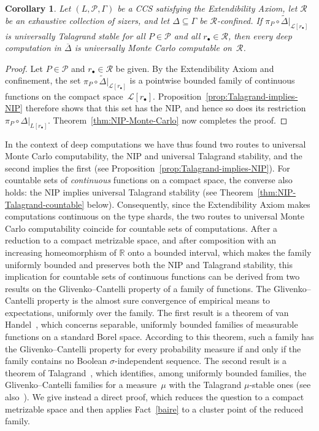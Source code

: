 \documentclass[psamsfonts]{amsart}
\newtheorem{cor}[thm]{Corollary}
\theoremstyle{definition}
\theoremstyle{remark}
\numberwithin{equation}{section}
\begin{document}
\begin{cor}
  \label{cor:Talagrand-stab-Monte-Carlo}
  Let $(L,\mathcal{P},\Gamma)$ be a CCS satisfying the Extendibility Axiom, let $\mathscr{R}$ be an exhaustive collection of sizers, and let $\Delta\subseteq\Gamma$ be $\mathscr{R}$-confined.
  If $\pi_P\circ\tilde\Delta|_{\mathcal{L}[r_\bullet]}$ is universally Talagrand stable for all $P\in\mathcal{P}$ and all $r_{\bullet}\in \mathscr{R}$, then every deep computation in $\overline{\Delta}$ is universally Monte Carlo computable on~$\mathscr{R}$.
\end{cor}

\begin{proof}
  Let $P\in\mathcal{P}$ and $r_\bullet\in \mathscr{R}$ be given.
  By the Extendibility Axiom and confinement, the set $\pi_P\circ\tilde\Delta|_{\mathcal{L}[r_\bullet]}$ is a pointwise bounded family of continuous functions on the compact space~$\mathcal{L}[r_\bullet]$.
  Proposition~\ref{prop:Talagrand-implies-NIP} therefore shows that this set has the NIP, and hence so does its restriction $\pi_P\circ\Delta|_{L[r_\bullet]}$.
  Theorem~\ref{thm:NIP-Monte-Carlo} now completes the proof.
\end{proof}

In the context of deep computations we have thus found two routes to universal Monte Carlo computability, the NIP and universal Talagrand stability, and the second implies the first (see Proposition~\ref{prop:Talagrand-implies-NIP}).
For countable sets of \emph{continuous} functions on a compact space, the converse also holds: the NIP implies universal Talagrand stability (see Theorem~\ref{thm:NIP-Talagrand-countable} below).
Consequently, since the Extendibility Axiom makes computations continuous on the type shards, the two routes to universal Monte Carlo computability coincide for countable sets of computations.
After a reduction to a compact metrizable space, and after composition with an increasing homeomorphism of $\mathbb{R}$ onto a bounded interval, which makes the family uniformly bounded and preserves both the NIP and Talagrand stability, this implication for countable sets of continuous functions can be derived from two results on the Glivenko--Cantelli property of a family of functions.
The Glivenko--Cantelli property is the almost sure convergence of empirical means to expectations, uniformly over the family.
The first result is a theorem of van Handel~\cite[Theorem~1.3]{vanHandel2013}, which concerns separable, uniformly bounded families of measurable functions on a standard Borel space.
According to this theorem, such a family has the Glivenko--Cantelli property for every probability measure if and only if the family contains no Boolean $\sigma$-independent sequence.
The second result is a theorem of Talagrand~\cite{talagrand1987glivenko}, which identifies, among uniformly bounded families, the Glivenko--Cantelli families for a measure~$\mu$ with the Talagrand $\mu$-stable ones (see also~\cite[\S465]{fremlin2003vol4}).
We give instead a direct proof, which reduces the question to a compact metrizable space and then applies Fact~\ref{baire} to a cluster point of the reduced family.
\end{document}
